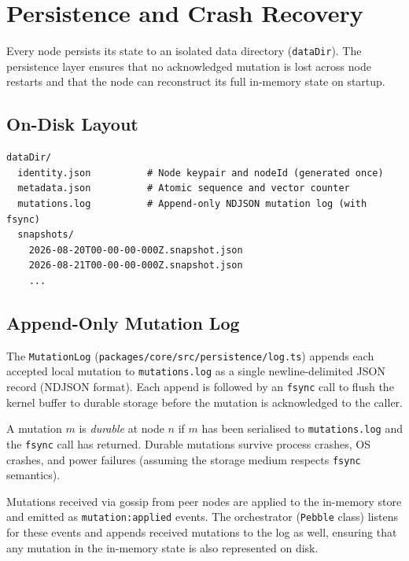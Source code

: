\section{Persistence and Crash Recovery}
\label{sec:persistence}

Every \pebble{} node persists its state to an isolated data directory
(\texttt{dataDir}). The persistence layer ensures that no acknowledged
mutation is lost across node restarts and that the node can reconstruct its
full in-memory state on startup.

\subsection{On-Disk Layout}

\begin{lstlisting}[caption={Data directory layout.}, language={}]
dataDir/
  identity.json          # Node keypair and nodeId (generated once)
  metadata.json          # Atomic sequence and vector counter
  mutations.log          # Append-only NDJSON mutation log (with fsync)
  snapshots/
    2026-08-20T00-00-00-000Z.snapshot.json
    2026-08-21T00-00-00-000Z.snapshot.json
    ...
\end{lstlisting}

\subsection{Append-Only Mutation Log}

The \texttt{MutationLog} (\texttt{packages/core/src/persistence/log.ts})
appends each accepted local mutation to \texttt{mutations.log} as a single
newline-delimited JSON record (NDJSON format). Each append is followed by an
\texttt{fsync} call to flush the kernel buffer to durable storage before the
mutation is acknowledged to the caller.

\begin{definition}
A mutation $m$ is \emph{durable} at node $n$ if $m$ has been serialised to
\texttt{mutations.log} and the \texttt{fsync} call has returned. Durable
mutations survive process crashes, OS crashes, and power failures (assuming the
storage medium respects \texttt{fsync} semantics).
\end{definition}

\begin{remark}
Mutations received via gossip from peer nodes are applied to the in-memory store
and emitted as \texttt{mutation:applied} events. The orchestrator (\texttt{Pebble}
class) listens for these events and appends received mutations to the log as
well, ensuring that any mutation in the in-memory state is also represented
on disk.
\end{remark}


